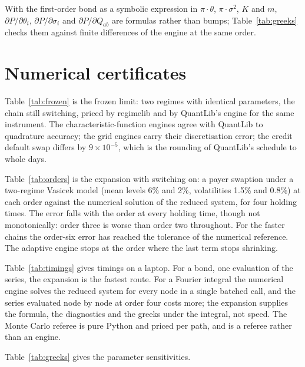 \documentclass[11pt]{article}
\theoremstyle{remark}
\newcommand{\rl}{\textsf{regimelib}}
\newcommand{\ql}{\textsf{QuantLib}}
\begin{document}
With the first-order bond as a symbolic expression in $\pi\cdot\theta$, $\pi\cdot\sigma^2$, $K$ and $m$,
$\partial P/\partial\theta_i$, $\partial P/\partial\sigma_i$ and $\partial P/\partial Q_{ab}$
are formulas rather than bumps; Table~\ref{tab:greeks} checks them against finite differences of the engine at
the same order.

\section{Numerical certificates}
\label{sec:numerics}

Table~\ref{tab:frozen} is the frozen limit: two regimes with identical parameters, the chain still switching,
priced by \rl{} and by \ql{}'s engine for the same instrument. The characteristic-function engines agree with
\ql{} to quadrature accuracy; the grid engines carry their discretisation error; the credit default swap
differs by $9\times10^{-5}$, which is the rounding of \ql{}'s schedule to whole days.

Table~\ref{tab:orders} is the expansion with switching on: a payer swaption under a two-regime Vasicek model
(mean levels 6\% and 2\%, volatilities 1.5\% and 0.8\%) at each order against the numerical solution of the
reduced system, for four holding times. The error falls with the order at every holding time, though not
monotonically: order three is worse than order two throughout. For the faster chains the order-six error has
reached the tolerance of the numerical reference. The adaptive engine stops at the order where the last term
stops shrinking.

Table~\ref{tab:timings} gives timings on a laptop. For a bond, one evaluation of the series, the expansion is
the fastest route. For a Fourier integral the numerical engine solves the reduced system for every node in a
single batched call, and the series evaluated node by node at order four costs more; the expansion supplies the
formula, the diagnostics and the greeks under the integral, not speed. The Monte Carlo referee is pure Python
and priced per path, and is a referee rather than an engine.

Table~\ref{tab:greeks} gives the parameter sensitivities.

\begin{table}[t]\centering\footnotesize
\resizebox{\textwidth}{!}{}
\caption{Frozen limit: two identical regimes on a chain with rates 3 and 5 per year, against \ql{}. Grid engines
(American, Bermudan, barrier) carry the grid's discretisation error; the characteristic-function engines agree to
quadrature accuracy.}
\label{tab:frozen}
\end{table}
\end{document}
